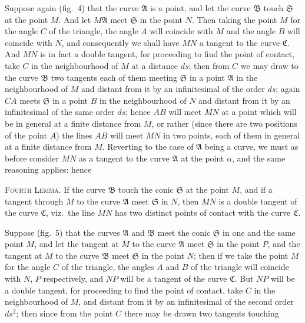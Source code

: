 \documentclass[11pt]{article}
\begin{document}
Suppose again (fig.~4) that the curve $\mathfrak{A}$ is a point, and let the curve $\mathfrak{B}$ touch
$\mathfrak{S}$ at the point $M$. And let $M\mathfrak{A}$ meet $\mathfrak{S}$ in the point $N$. Then taking the point
$M$ for the angle $C$ of the triangle, the angle $A$ will coincide with $M$ and the angle
$B$ will coincide with $N$, and consequently we shall have $MN$ a tangent to the curve
$\mathfrak{C}$. And $MN$ is in fact a double tangent, for proceeding to find the point of contact,
take $C$ in the neighbourhood of $M$ at a distance $ds$; then from $C$ we may draw to
the curve $\mathfrak{B}$ two tangents each of them meeting $\mathfrak{S}$ in a point $\mathfrak{A}$ in the neighbour\-hood of $M$ and distant from it by an infinitesimal of the order $ds$; again $CA$ meets
$\mathfrak{S}$ in a point $B$ in the neighbourhood of $N$ and distant from it by an infinitesimal
of the same order $ds$; hence $AB$ will meet $MN$ at a point which will be in general
at a finite distance from $M$, or rather (since there are two positions of the point $A$)
the lines $AB$ will meet $MN$ in two points, each of them in general at a finite
distance from $M$. Reverting to the case of $\mathfrak{A}$ being a curve, we must as before
consider $MN$ as a tangent to the curve $\mathfrak{A}$ at the point $\alpha$, and the same reasoning
applies: hence

\textsc{Fourth Lemma.} If the curve $\mathfrak{B}$ touch the conic $\mathfrak{S}$ at the point $M$, and if a
tangent through $M$ to the curve $\mathfrak{A}$ meet $\mathfrak{S}$ in $N$, then $MN$ is a double tangent of
the curve $\mathfrak{C}$, viz.\ the line $MN$ has two distinct points of contact with the curve $\mathfrak{C}$.

Suppose (fig.~5) that the curves $\mathfrak{A}$ and $\mathfrak{B}$ meet the conic $\mathfrak{S}$ in one and the
same point $M$, and let the tangent at $M$ to the curve $\mathfrak{A}$ meet $\mathfrak{S}$ in the point $P$,
and the tangent at $M$ to the curve $\mathfrak{B}$ meet $\mathfrak{S}$ in the point $N$; then if we take
the point $M$ for the angle $C$ of the triangle, the angles $A$ and $B$ of the triangle
will coincide with $N$, $P$ respectively, and $NP$ will be a tangent of the curve $\mathfrak{C}$.
But $NP$ will be a double tangent, for proceeding to find the point of contact, take
$C$ in the neighbourhood of $M$, and distant from it by an infinitesimal of the second
order $ds^{2}$; then since from the point $C$ there may be drawn two tangents touching

\newpage
\end{document}
